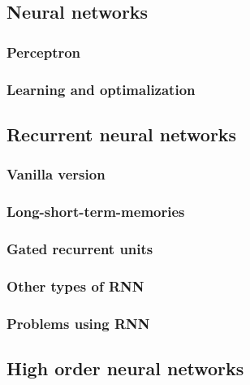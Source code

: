 \documentclass[a4paper, twoside]{article}
\begin{document}
\subsection{Neural networks}
\label{sub:neural_networks}

\subsubsection{Perceptron}
\label{ssub:perceptron}

\subsubsection{Learning and optimalization}
\label{ssub:learning_and_optimalization}

\subsection{Recurrent neural networks}
\label{sub:recurrent_neural_networks}


\subsubsection{Vanilla version}
\label{ssub:vanilla_version}

\subsubsection{Long-short-term-memories}
\label{ssub:long_short_term_memories}

\subsubsection{Gated recurrent units}
\label{ssub:gated_recurrent_units}


\subsubsection{Other types of RNN}
\label{ssub:other_types_of_rnn}

\subsubsection{Problems using RNN}
\label{ssub:problems_using_rnn}


\subsection{High order neural networks}
\label{sub:high_order_neural_networks}
\end{document}
